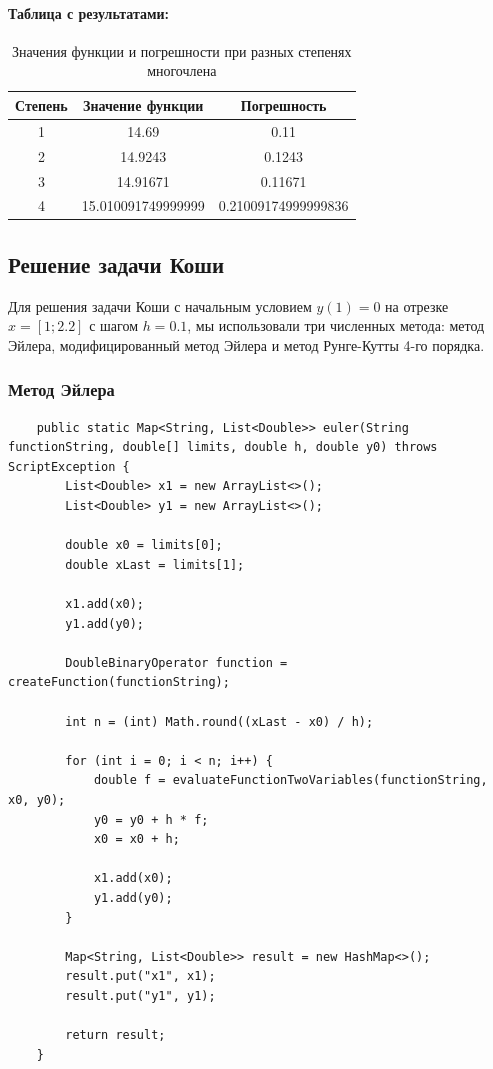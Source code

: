 \documentclass[12pt]{article}
\begin{document}
    \clearpage
    \paragraph*{Таблица с результатами:}
    \begin{table}
        \centering
        \caption{Значения функции и погрешности при разных степенях многочлена}
        \begin{tabular}{|c|c|c|}
            \hline
            \textbf{Степень} & \textbf{Значение функции} & \textbf{Погрешность} \\
            \hline
            1                & 14.69                    & 0.11                 \\
            2                & 14.9243                  & 0.1243               \\
            3                & 14.91671                 & 0.11671              \\
            4                & 15.010091749999999       & 0.21009174999999836  \\
            \hline
        \end{tabular}
        \label{tab:results}
    \end{table}

    \subsection{Решение задачи Коши}

    Для решения задачи Коши с начальным условием $y(1)=0$ на отрезке $x=[1;2.2]$ с шагом $h=0.1$, мы использовали три численных метода: метод Эйлера, модифицированный метод Эйлера и метод Рунге-Кутты 4-го порядка.

    \subsubsection{Метод Эйлера}


    \begin{verbatim}
    public static Map<String, List<Double>> euler(String functionString, double[] limits, double h, double y0) throws ScriptException {
        List<Double> x1 = new ArrayList<>();
        List<Double> y1 = new ArrayList<>();

        double x0 = limits[0];
        double xLast = limits[1];

        x1.add(x0);
        y1.add(y0);

        DoubleBinaryOperator function = createFunction(functionString);

        int n = (int) Math.round((xLast - x0) / h);

        for (int i = 0; i < n; i++) {
            double f = evaluateFunctionTwoVariables(functionString, x0, y0);
            y0 = y0 + h * f;
            x0 = x0 + h;

            x1.add(x0);
            y1.add(y0);
        }

        Map<String, List<Double>> result = new HashMap<>();
        result.put("x1", x1);
        result.put("y1", y1);

        return result;
    }
    \end{verbatim}
\end{document}
